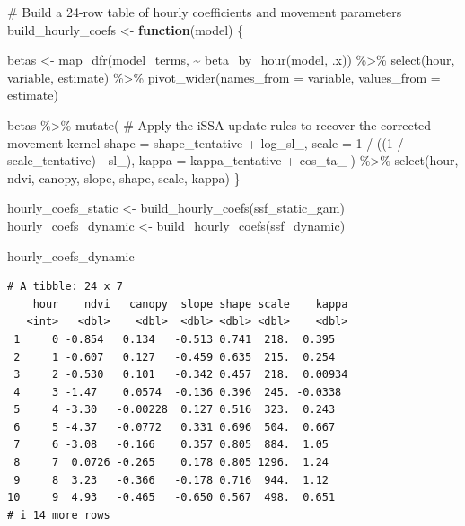 \documentclass[
  letterpaper,
  DIV=11,
  numbers=noendperiod]{scrartcl}
\newenvironment{Shaded}{\begin{snugshade}}{\end{snugshade}}
\newcommand{\AttributeTok}[1]{\textcolor[rgb]{0.40,0.45,0.13}{#1}}
\newcommand{\CommentTok}[1]{\textcolor[rgb]{0.37,0.37,0.37}{#1}}
\newcommand{\ControlFlowTok}[1]{\textcolor[rgb]{0.00,0.23,0.31}{\textbf{#1}}}
\newcommand{\DecValTok}[1]{\textcolor[rgb]{0.68,0.00,0.00}{#1}}
\newcommand{\FunctionTok}[1]{\textcolor[rgb]{0.28,0.35,0.67}{#1}}
\newcommand{\NormalTok}[1]{\textcolor[rgb]{0.00,0.23,0.31}{#1}}
\newcommand{\OtherTok}[1]{\textcolor[rgb]{0.00,0.23,0.31}{#1}}
\newcommand{\SpecialCharTok}[1]{\textcolor[rgb]{0.37,0.37,0.37}{#1}}
\begin{document}
\begin{Shaded}
\begin{Highlighting}[]
\CommentTok{\#\textquotesingle{} Build a 24{-}row table of hourly coefficients and movement parameters}
\NormalTok{build\_hourly\_coefs }\OtherTok{\textless{}{-}} \ControlFlowTok{function}\NormalTok{(model) \{}

\NormalTok{  betas }\OtherTok{\textless{}{-}} \FunctionTok{map\_dfr}\NormalTok{(model\_terms, }\SpecialCharTok{\textasciitilde{}} \FunctionTok{beta\_by\_hour}\NormalTok{(model, .x)) }\SpecialCharTok{\%\textgreater{}\%}
    \FunctionTok{select}\NormalTok{(hour, variable, estimate) }\SpecialCharTok{\%\textgreater{}\%}
    \FunctionTok{pivot\_wider}\NormalTok{(}\AttributeTok{names\_from =}\NormalTok{ variable, }\AttributeTok{values\_from =}\NormalTok{ estimate)}

\NormalTok{  betas }\SpecialCharTok{\%\textgreater{}\%}
    \FunctionTok{mutate}\NormalTok{(}
      \CommentTok{\# Apply the iSSA update rules to recover the corrected movement kernel}
      \AttributeTok{shape =}\NormalTok{ shape\_tentative }\SpecialCharTok{+}\NormalTok{ log\_sl\_,}
      \AttributeTok{scale =} \DecValTok{1} \SpecialCharTok{/}\NormalTok{ ((}\DecValTok{1} \SpecialCharTok{/}\NormalTok{ scale\_tentative) }\SpecialCharTok{{-}}\NormalTok{ sl\_),}
      \AttributeTok{kappa =}\NormalTok{ kappa\_tentative }\SpecialCharTok{+}\NormalTok{ cos\_ta\_}
\NormalTok{    ) }\SpecialCharTok{\%\textgreater{}\%}
    \FunctionTok{select}\NormalTok{(hour, ndvi, canopy, slope, shape, scale, kappa)}
\NormalTok{\}}

\NormalTok{hourly\_coefs\_static  }\OtherTok{\textless{}{-}} \FunctionTok{build\_hourly\_coefs}\NormalTok{(ssf\_static\_gam)}
\NormalTok{hourly\_coefs\_dynamic }\OtherTok{\textless{}{-}} \FunctionTok{build\_hourly\_coefs}\NormalTok{(ssf\_dynamic)}

\NormalTok{hourly\_coefs\_dynamic}
\end{Highlighting}
\end{Shaded}

\begin{verbatim}
# A tibble: 24 x 7
    hour    ndvi   canopy  slope shape scale    kappa
   <int>   <dbl>    <dbl>  <dbl> <dbl> <dbl>    <dbl>
 1     0 -0.854   0.134   -0.513 0.741  218.  0.395  
 2     1 -0.607   0.127   -0.459 0.635  215.  0.254  
 3     2 -0.530   0.101   -0.342 0.457  218.  0.00934
 4     3 -1.47    0.0574  -0.136 0.396  245. -0.0338 
 5     4 -3.30   -0.00228  0.127 0.516  323.  0.243  
 6     5 -4.37   -0.0772   0.331 0.696  504.  0.667  
 7     6 -3.08   -0.166    0.357 0.805  884.  1.05   
 8     7  0.0726 -0.265    0.178 0.805 1296.  1.24   
 9     8  3.23   -0.366   -0.178 0.716  944.  1.12   
10     9  4.93   -0.465   -0.650 0.567  498.  0.651  
# i 14 more rows
\end{verbatim}
\end{document}
